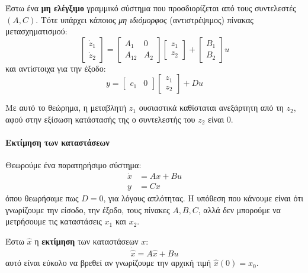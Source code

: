 \documentclass[11pt,a4paper,notitlepage,fleqn]{article}
\let\mytodo\todo
\renewcommand{\todo}[1]{\par\mytodo[inline,noline]{#1}}
\begin{document}
\begin{theorem}{}{}
	Έστω ένα \textbf{μη ελέγξιμο} γραμμικό σύστημα που προσδιορίζεται
	από τους συντελεστές \( (A,C) \). Τότε υπάρχει κάποιος \textit{μη ιδιόμορφος} (αντιστρέψιμος) πίνακας μετασχηματισμού:
	\[
	\left[\begin{matrix}
	\dot z_1 \\ \dot z_2
	\end{matrix}\right] = \left[\begin{matrix}
	A_1 & 0 \\ A_{12} & A_{2}
	\end{matrix}\right]\left[\begin{matrix}
	z_1 \\ z_2
	\end{matrix}\right] + \left[\begin{matrix}
	B_1 \\ B_2
	\end{matrix}\right]u
	\]
	και αντίστοιχα για την έξοδο:\[
	y = \left[ \begin{matrix}
	c_1 & 0
	\end{matrix} \right]\left[\begin{matrix}
	z_1 \\ z_2
	\end{matrix}\right] + Du
	\]
	\todo{add}
\end{theorem}

Με αυτό το θεώρημα, η μεταβλητή \( z_1 \) ουσιαστικά καθίσταται ανεξάρτητη
από τη \( z_2 \), αφού στην εξίσωση κατάστασής της ο συντελεστής του
\( z_2 \) είναι 0.


\paragraph{Εκτίμηση των καταστάσεων}
Θεωρούμε ένα παρατηρήσιμο σύστημα:
\begin{align*}
	\dot x &= Ax + Bu\\
	y &= Cx
\end{align*}
όπου θεωρήσαμε πως \( D= 0 \), για λόγους απλότητας. Η υπόθεση που κάνουμε
είναι ότι γνωρίζουμε την είσοδο, την έξοδο, τους πίνακες \( A,B,C \), αλλά
δεν μπορούμε να μετρήσουμε τις καταστάσεις \( x_1 \) και \( x_2 \).

Έστω \( \hat x \) η \textbf{εκτίμηση} των καταστάσεων \( x \):
\begin{equation}
\label{eq:sec5approx}
\dot{\hat{x}} = A\hat x + Bu
\end{equation}
αυτό είναι εύκολο να βρεθεί αν γνωρίζουμε την αρχική τιμή \( \hat x(0) = \hat x_0 \).
\end{document}
